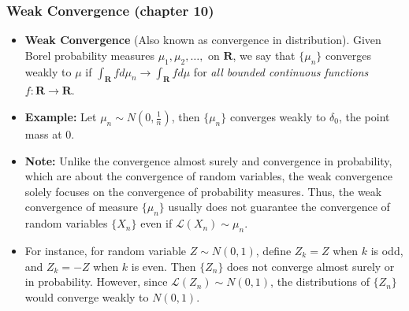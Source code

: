 \documentclass[handout]{beamer}
\begin{document}
\frame
{
  \frametitle{Weak Convergence (chapter 10) } 

   \begin{itemize}

                 \item<1-> \textbf{Weak Convergence} (Also known as convergence in distribution). Given Borel probability measures $\mu_1, \mu_2,\ldots, $ on $\mathbf{R}$, we say that $\{\mu_n \}$ converges weakly to $\mu$ if $\int_{\mathbf{R}} f d\mu_n \rightarrow \int_{\mathbf{R}}f d\mu$ for \textit{all bounded continuous functions} $f:\mathbf{R}\rightarrow \mathbf{R}$. 

                 \item<2-> \textbf{Example:} Let $\mu_n\sim N(0, \frac{1}{n})$, then  $\{\mu_n \}$ converges weakly to $\delta_0$, the point mass at $0$. 

                 \item<3-> \textbf{Note:} Unlike the convergence almost surely and convergence in probability, which are about the convergence of random variables, the weak convergence solely focuses on the convergence of probability measures. Thus, the weak convergence of measure $\{\mu_n \}$ usually does not guarantee the convergence of random variables $\{X_n\}$ even if $\mathcal{L} (X_n)\sim \mu_n$. 
                 
                   \item<4-> For instance, for random variable $Z\sim N(0,1)$, define $Z_k=Z$ when $k$ is odd, and $Z_k=-Z$ when $k$ is even. Then $\{Z_n\}$ does not converge almost surely or in probability. However, since $\mathcal{L} (Z_n) \sim N(0,1)$,  the distributions of $\{Z_n\}$ would converge weakly to $N(0,1)$.
                   
                                               \end{itemize}
}
\end{document}
